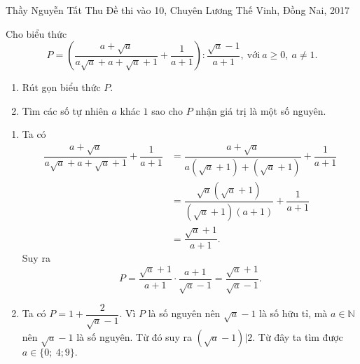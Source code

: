 \begin{name}
{Thầy  Nguyễn Tất Thu}
{Đề thi vào 10, Chuyên Lương Thế Vinh, Đồng Nai, 2017}
\end{name}
\setcounter{ex}{0}
\begin{ex}%
    
    Cho biểu thức $$P=\left(\dfrac{a+\sqrt{a}}{a\sqrt{a}+a+\sqrt{a}+1}+\dfrac{1}{a+1} \right): \dfrac{\sqrt{a}-1}{a+1},\ \text{với}\ a \geq 0,\ a\neq 1.$$

    \begin{enumerate}
        \item Rút gọn biểu thức $P$.
        \item Tìm các số tự nhiên $a$ khác $1$ sao cho $P$ nhận giá trị là một số nguyên.
    \end{enumerate}
\loigiai
    { \hfill
    
    \begin{enumerate}
    \item Ta có 
    $$\begin{aligned} \dfrac{a+\sqrt{a}}{a\sqrt{a}+a+\sqrt{a}+1}+\dfrac{1}{a+1}&=\dfrac{a+\sqrt{a}}{a(\sqrt{a}+1)+(\sqrt{a}+1)}+\dfrac{1}{a+1}\\&=\dfrac{\sqrt{a} \left(\sqrt{a}+1\right)}{\left(\sqrt{a}+1 \right)(a+1)}+\dfrac{1}{a+1}\\&= \dfrac{\sqrt{a}+1}{a+1}. \end{aligned}$$
    Suy ra $$P=\dfrac{\sqrt{a}+1}{a+1} \cdot \dfrac{a+1}{\sqrt{a}-1}=\dfrac{\sqrt{a}+1}{\sqrt{a}-1}.$$
    \item Ta có $P=1+\dfrac{2}{\sqrt{a}-1}$.
    Vì $P$ là số nguyên nên $\sqrt{a}-1$ là số hữu tỉ, mà $a \in \mathbb{N}$ nên $\sqrt{a}-1$ là số nguyên. Từ đó suy ra $(\sqrt{a}-1)|2$. Từ đây ta tìm được $a \in \{0;\ 4; 9 \}.$
    \end{enumerate}
       }
\end{ex}

